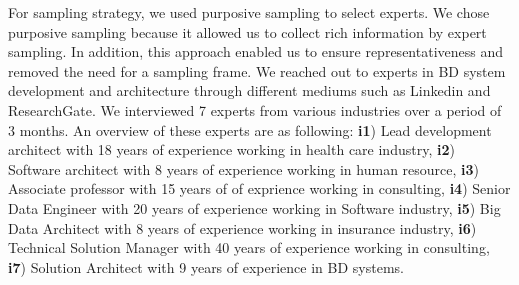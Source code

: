 \documentclass[a4paper,11pt,article,oneside]{memoir}
\begin{document}
For sampling strategy, we used purposive sampling \citep{baltes2022sampling} to select experts. We chose purposive sampling because it allowed us to collect rich information by expert sampling. In addition, this approach enabled us to ensure representativeness and removed the need for a sampling frame. We reached out to experts in BD system development and architecture through different mediums such as Linkedin and ResearchGate. We interviewed 7 experts from various industries over a period of 3 months. An overview of these experts are as following: \textbf{i1}) Lead development architect with 18 years of experience working in health care industry, \textbf{i2}) Software architect with 8 years of experience working in human resource, \textbf{i3}) Associate professor with 15 years of of exprience working in consulting, \textbf{i4}) Senior Data Engineer with 20 years of experience working in Software industry, \textbf{i5}) Big Data Architect with 8 years of experience working in insurance industry, \textbf{i6}) Technical Solution Manager with 40 years of experience working in consulting, \textbf{i7}) Solution Architect with 9 years of experience in BD systems. 


\end{document}
